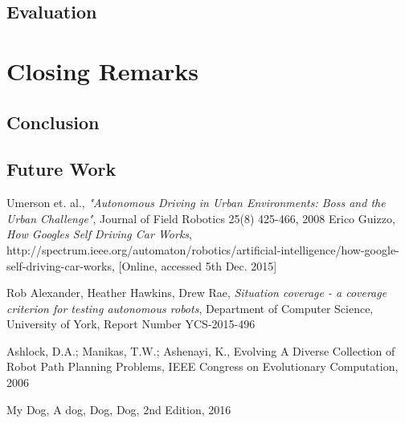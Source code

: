 \documentclass[authoryearcitations]{UoYCSproject}
\begin{document}
\chapter{Evaluation}
\label{cha:Evaluation}

\part{Closing Remarks}
\label{sec:close}
\chapter{Conclusion}
\label{cha:conclusion}
\chapter{Future Work}
\label{cha:futWork}

\begin{thebibliography}{56}
	Umerson et. al.,
	\emph{"Autonomous Driving in Urban Environments: Boss and the Urban Challenge"},
	Journal of Field Robotics 25(8) 425-466,
	2008
	Erico Guizzo, 
	\emph{How Googles Self Driving Car Works}, 
	http://spectrum.ieee.org/automaton/robotics/artificial-intelligence/how-google-self-driving-car-works, 
	[Online, accessed 5th Dec. 2015]
	
	Rob Alexander, Heather Hawkins, Drew Rae,
	\emph{Situation coverage - a coverage criterion for testing autonomous robots},
	Department of Computer Science, University of York,
	Report Number YCS-2015-496
	
	Ashlock, D.A.; Manikas, T.W.; Ashenayi, K.,
	Evolving A Diverse Collection of Robot Path Planning Problems,
	IEEE Congress on Evolutionary Computation,
    2006



	My Dog,
	A dog,
	Dog, Dog,
	2nd Edition,
	2016
\end{thebibliography}
\end{document}
